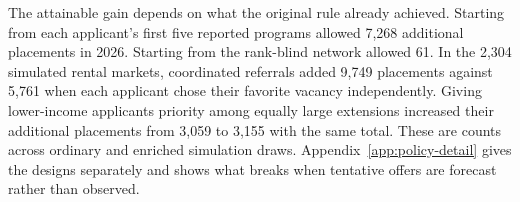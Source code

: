 The attainable gain depends on what the original rule already achieved. Starting from each applicant's first five reported programs allowed 7,268 additional placements in 2026. Starting from the rank-blind network allowed 61. In the 2,304 simulated rental markets, coordinated referrals added 9,749 placements against 5,761 when each applicant chose their favorite vacancy independently. Giving lower-income applicants priority among equally large extensions increased their additional placements from 3,059 to 3,155 with the same total. These are counts across ordinary and enriched simulation draws. Appendix~\ref{app:policy-detail} gives the designs separately and shows what breaks when tentative offers are forecast rather than observed.
